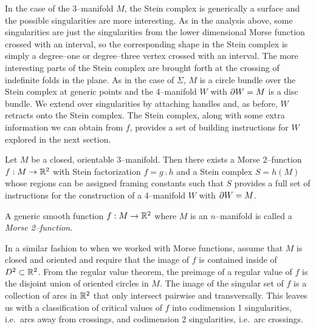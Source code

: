 In the case of the 3--manifold $M$, the Stein complex is generically a surface and the possible singularities are more interesting.
As in the analysis above, some singularities are just the singularities from the lower dimensional Morse function crossed with an interval, so the corresponding shape in the Stein complex is simply a degree--one or degree--three vertex crossed with an interval.
The more interesting parts of the Stein complex are brought forth at the crossing of indefinite folds in the plane.
As in the case of $\Sigma$, $M$ is a circle bundle over the Stein complex at generic points and the 4--manifold $W$ with $\partial W = M$ is a disc bundle.
We extend over singularities by attaching handles and, as before, $W$ retracts onto the Stein complex.
The Stein complex, along with some extra information we can obtain from $f$, provides a set of building instructions for $W$ explored in the next section.


\begin{cor}
	Let $M$ be a closed, orientable 3--manifold.
	Then there exists a Morse 2--function $f:M\to\mathbb{R}^2$ with Stein factorization $f=g\comp h$ and a Stein complex $S=h(M)$ whose regions can be assigned framing constants such that $S$ provides a full set of instructions for the construction of a 4--manifold $W$ with $\partial W=M$.
\end{cor}





\begin{defn}
	\label{def:morse2function}
	A generic smooth function $f:M\to\mathbb{R}^2$ where $M$ is an $n$--manifold is called a \emph{Morse 2--function}.
\end{defn}







In a similar fashion to when we worked with Morse functions, assume that $M$ is closed and oriented and require that the image of $f$ is contained inside of $D^2\subset\mathbb{R}^2$.
From the regular value theorem, the preimage of a regular value of $f$ is the disjoint union of oriented circles in $M$.
The image of the singular set of $f$ is a collection of arcs in $\mathbb{R}^2$ that only intersect pairwise and transversally.
This leaves us with a classification of critical values of $f$ into codimension 1 singularities, i.e.\ arcs away from crossings, and codimension 2 singularities, i.e.\ arc crossings.

